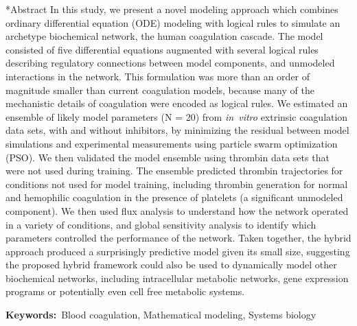 \documentclass[12pt]{article}
\makeatletter
\renewcommand\section{\@startsection
	{subsection}{2}{0mm}
	{-0.2in}
	{0.05\baselineskip}
	{\normalfont\large\bfseries}}
\makeatother
\begin{document}
\section*{Abstract}
In this study, we present a novel modeling approach which combines ordinary differential equation (ODE) 
modeling with logical rules to simulate an archetype biochemical network, the human coagulation cascade.  
The model consisted of five differential equations augmented with several logical rules describing 
regulatory connections between model components, and unmodeled interactions in the network. 
This formulation was more than an order of magnitude smaller than current coagulation models, 
because many of the mechanistic details of coagulation were encoded as logical rules.
We estimated an ensemble of likely model parameters (N = 20) from \textit{in~vitro} extrinsic coagulation data sets, with and without inhibitors, 
by minimizing the residual between model simulations and experimental measurements using particle swarm optimization (PSO). 
We then validated the model ensemble using thrombin data sets that were not used during training. 
The ensemble predicted thrombin trajectories for conditions not used for model training, including thrombin generation for normal and hemophilic coagulation 
in the presence of platelets (a significant unmodeled component).
We then used flux analysis to understand how the network operated in a variety of conditions, and global sensitivity analysis to identify which parameters controlled the 
performance of the network. Taken together, the hybrid approach produced a surprisingly predictive model given its small size, 
suggesting the proposed hybrid framework could also be used to dynamically model other biochemical networks, including intracellular metabolic networks, gene expression programs 
or potentially even cell free metabolic systems. 

\vspace{0.25in}
{\noindent \textbf{Keywords:}~Blood coagulation, Mathematical modeling, Systems biology}

\pagebreak

\setcounter{page}{1}

\linenumbers

%
\end{document}
